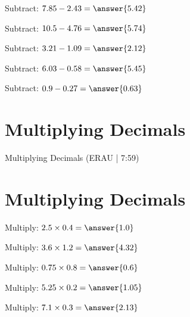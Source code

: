 \documentclass{ximera}
\begin{document}
\begin{problem}
\begin{problem}
Subtract: $7.85 - 2.43 = \answer{5.42}$
\end{problem}

\begin{problem}
Subtract: $10.5 - 4.76 = \answer{5.74}$
\end{problem}

\begin{problem}
Subtract: $3.21 - 1.09 = \answer{2.12}$
\end{problem}

\begin{problem}
Subtract: $6.03 - 0.58 = \answer{5.45}$
\end{problem}

\begin{problem}
Subtract: $0.9 - 0.27 = \answer{0.63}$
\end{problem}


\section*{Multiplying Decimals}

Multiplying Decimals (ERAU | 7:59)



\section*{Multiplying Decimals}

\begin{problem}
Multiply: $2.5 \times 0.4 = \answer{1.0}$
\end{problem}

\begin{problem}
Multiply: $3.6 \times 1.2 = \answer{4.32}$
\end{problem}

\begin{problem}
Multiply: $0.75 \times 0.8 = \answer{0.6}$
\end{problem}

\begin{problem}
Multiply: $5.25 \times 0.2 = \answer{1.05}$
\end{problem}

\begin{problem}
Multiply: $7.1 \times 0.3 = \answer{2.13}$
\end{problem}


\end{problem}
\end{document}
